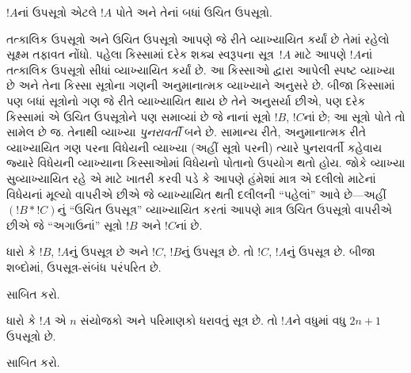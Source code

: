 \begin{defn}[ઉપસૂત્ર]
$!A$નાં ઉપસૂત્રો એટલે $!A$ પોતે અને તેનાં બધાં ઉચિત
ઉપસૂત્રો.
\end{defn}

\begin{explain}
તત્કાલિક ઉપસૂત્રો અને ઉચિત ઉપસૂત્રો આપણે જે રીતે
વ્યાખ્યાયિત કર્યાં છે તેમાં રહેલો સૂક્ષ્મ તફાવત નોંધો. પહેલા કિસ્સામાં
દરેક શક્ય સ્વરૂપના સૂત્ર~$!A$ માટે આપણે $!A$નાં તત્કાલિક
ઉપસૂત્રો સીધાં વ્યાખ્યાયિત કર્યાં છે. આ કિસ્સાઓ દ્વારા આપેલી સ્પષ્ટ વ્યાખ્યા
છે અને તેના કિસ્સા સૂત્રોના ગણની અનુમાનાત્મક વ્યાખ્યાને અનુસરે
છે. બીજા કિસ્સામાં પણ બધાં સૂત્રોનો ગણ જે રીતે વ્યાખ્યાયિત થાય
છે તેને અનુસર્યા છીએ, પણ દરેક કિસ્સામાં એ ઉચિત ઉપસૂત્રોને પણ
સમાવ્યાં છે જે નાનાં સૂત્રો $!B$, $!C$નાં છે; આ સૂત્રો
પોતે તો સામેલ છે જ. તેનાથી
વ્યાખ્યા \emph{પુનરાવર્તી} બને છે. સામાન્ય રીતે, અનુમાનાત્મક રીતે
વ્યાખ્યાયિત ગણ પરના વિધેયની વ્યાખ્યા (અહીં સૂત્રો પરની)
ત્યારે પુનરાવર્તી કહેવાય જ્યારે વિધેયની વ્યાખ્યાના કિસ્સાઓમાં વિધેયનો
પોતાનો ઉપયોગ થતો હોય. જોકે વ્યાખ્યા સુવ્યાખ્યાયિત રહે એ માટે ખાતરી
કરવી પડે કે આપણે હંમેશાં માત્ર એ દલીલો માટેનાં વિધેયનાં મૂલ્યો વાપરીએ
છીએ જે વ્યાખ્યાયિત થતી દલીલની ``પહેલાં'' આવે છે---અહીં
$(!B\ast !C)$નું ``ઉચિત ઉપસૂત્ર'' વ્યાખ્યાયિત કરતાં આપણે માત્ર
ઉચિત ઉપસૂત્રો વાપરીએ છીએ જે ``અગાઉનાં'' સૂત્રો $!B$ અને
$!C$નાં છે.
\end{explain}

\begin{prop}
ધારો કે $!B$, $!A$નું ઉપસૂત્ર છે અને $!C$, $!B$નું ઉપસૂત્ર છે. તો
$!C$, $!A$નું ઉપસૂત્ર છે. બીજા શબ્દોમાં, ઉપસૂત્ર-સંબંધ પરંપરિત છે.
\end{prop}

\begin{prob}
 સાબિત કરો.
\end{prob}

\begin{prop}
ધારો કે $!A$ એ $n$ સંયોજકો અને પરિમાણકો ધરાવતું સૂત્ર છે. તો $!A$ને
વધુમાં વધુ $2n+1$ ઉપસૂત્રો છે.
\end{prop}

\begin{prob}
 સાબિત કરો.
\end{prob}
\endgroup


\begingroup
\makeatletter{}\makeatother


\label{guunit:OLP-0156}


